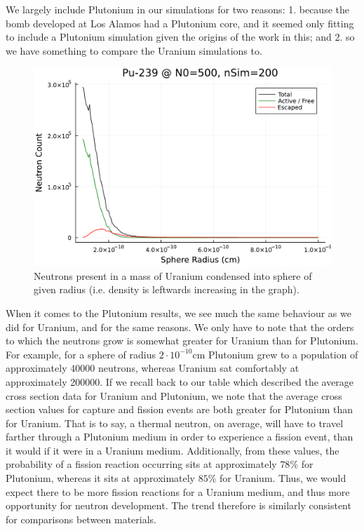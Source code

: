 We largely include Plutonium in our simulations for two reasons: 1. because the bomb developed at Los Alamos had a Plutonium core, and 
it seemed only fitting to include a Plutonium simulation given the origins of the work in this; and 2. so we have something to compare the 
Uranium simulations to. 

\begin{figure}[h!]
    \centering
    \includegraphics[scale=0.55]{imgs/radius-variation-plutonium.pdf}
    \caption{Neutrons present in a mass of Uranium condensed into sphere of given radius (i.e. density is leftwards increasing in 
    the graph).}
    \label{plutonium-total}
\end{figure}

When it comes to the Plutonium results, we see much the same behaviour as we did for Uranium, and for the same reasons. We only have 
to note that the orders to which the neutrons grow is somewhat greater for Uranium than for Plutonium. For example, for a sphere 
of radius $2 \cdot 10^{-10}\text{cm}$ Plutonium grew to a population of approximately 40000 neutrons, whereas Uranium sat 
comfortably at approximately 200000. If we recall back to our table which described the average cross section data for 
Uranium and Plutonium, we note that the average cross section values for capture and fission events are both greater for Plutonium 
than for Uranium. That is to say, a thermal neutron, on average, will have to travel farther through a Plutonium medium in order 
to experience a fission event, than it would if it were in a Uranium medium. Additionally, from these values, the probability 
of a fission reaction occurring sits at approximately $78$\% for Plutonium, whereas it sits at approximately $85$\% for Uranium.
Thus, we would expect there to be more fission reactions for a Uranium medium, and thus more opportunity for neutron development. The 
trend therefore is similarly consistent for comparisons between materials.